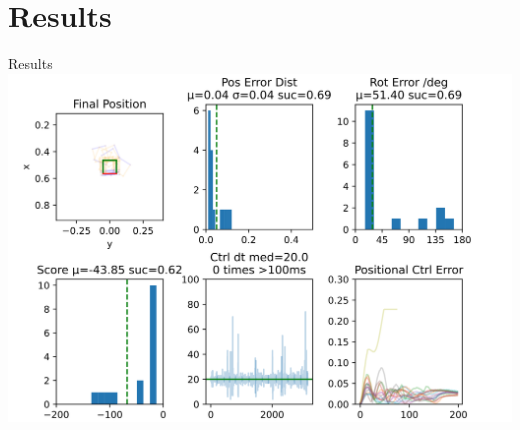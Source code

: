 \documentclass[16:9,en,navbarinfooter]{sdqbeamer}
\begin{document}
\section{Results}
\begin{frame}{Results}
\center
    \includegraphics[width=.7\linewidth]{media/results.png} 
\end{frame}


\appendix
\beginbackup{}
\backupend{}
\end{document}
